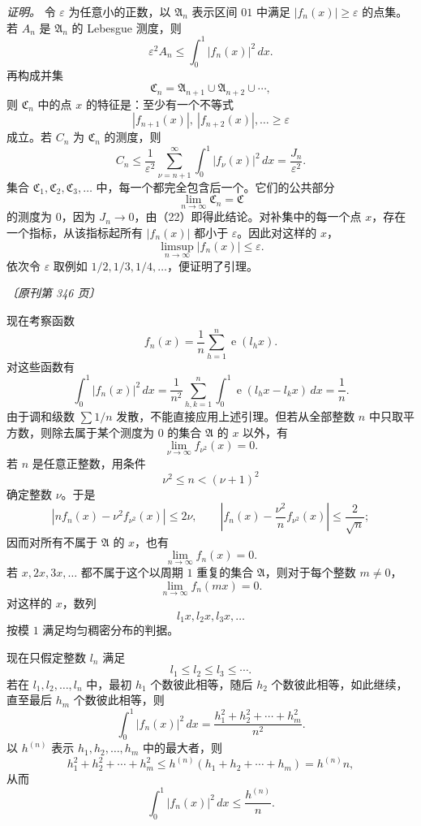 \documentclass[UTF8,11pt,a4paper,fontset=none]{ctexart}
\theoremstyle{weylthm}
\newcommand{\e}{\operatorname{e}}
\newcommand{\origpage}[1]{%
  \par\vspace{0.7em}\noindent\hfill{\small\itshape〔原刊第 #1 页〕}\par\vspace{0.25em}}
\begin{document}
\textit{证明。}
令 \(\varepsilon\) 为任意小的正数，以 \(\mathfrak A_n\) 表示区间 \(01\) 中满足
\(|f_n(x)|\geq\varepsilon\) 的点集。若 \(A_n\) 是 \(\mathfrak A_n\) 的 Lebesgue 测度，则
\[
  \varepsilon^2A_n\leq\int_0^1|f_n(x)|^2\,dx.
\]
再构成并集
\[
  \mathfrak C_n=\mathfrak A_{n+1}\cup\mathfrak A_{n+2}\cup\cdots,
\]
则 \(\mathfrak C_n\) 中的点 \(x\) 的特征是：至少有一个不等式
\[
  |f_{n+1}(x)|,\ |f_{n+2}(x)|,\ldots\geq\varepsilon
\]
成立。若 \(C_n\) 为 \(\mathfrak C_n\) 的测度，则
\begin{equation}
  C_n\leq\frac1{\varepsilon^2}
  \sum_{\nu=n+1}^{\infty}\int_0^1|f_\nu(x)|^2\,dx
  =\frac{J_n}{\varepsilon^2}.
  \tag{22}
\end{equation}
集合 \(\mathfrak C_1,\mathfrak C_2,\mathfrak C_3,\ldots\) 中，每一个都完全包含后一个。它们的公共部分
\[
  \lim_{n\to\infty}\mathfrak C_n=\mathfrak C
\]
的测度为 \(0\)，因为 \(J_n\to0\)，由（22）即得此结论。对补集中的每一个点 \(x\)，存在一个指标，从该指标起所有
\(|f_n(x)|\) 都小于 \(\varepsilon\)。因此对这样的 \(x\)，
\[
  \limsup_{n\to\infty}|f_n(x)|\leq\varepsilon.
\]
依次令 \(\varepsilon\) 取例如 \(1/2,1/3,1/4,\ldots\)，便证明了引理。

\origpage{346}

现在考察函数
\[
  f_n(x)=\frac1n\sum_{h=1}^{n}\e(l_hx).
\]
对这些函数有
\[
  \int_0^1|f_n(x)|^2\,dx
  =\frac1{n^2}\sum_{h,k=1}^{n}\int_0^1\e(l_hx-l_kx)\,dx
  =\frac1n.
\]
由于调和级数 \(\sum 1/n\) 发散，不能直接应用上述引理。但若从全部整数 \(n\) 中只取平方数，则除去属于某个测度为 \(0\) 的集合 \(\mathfrak A\) 的 \(x\) 以外，有
\[
  \lim_{\nu\to\infty}f_{\nu^2}(x)=0.
\]
若 \(n\) 是任意正整数，用条件
\[
  \nu^2\leq n<(\nu+1)^2
\]
确定整数 \(\nu\)。于是
\[
  |nf_n(x)-\nu^2f_{\nu^2}(x)|\leq2\nu,
  \qquad
  \left|f_n(x)-\frac{\nu^2}{n}f_{\nu^2}(x)\right|
  \leq\frac2{\sqrt n};
\]
因而对所有不属于 \(\mathfrak A\) 的 \(x\)，也有
\[
  \lim_{n\to\infty}f_n(x)=0.
\]
若 \(x,2x,3x,\ldots\) 都不属于这个以周期 \(1\) 重复的集合 \(\mathfrak A\)，则对于每个整数 \(m\neq0\)，
\[
  \lim_{n\to\infty}f_n(mx)=0.
\]
对这样的 \(x\)，数列
\[
  l_1x,l_2x,l_3x,\ldots
\]
按模 \(1\) 满足均匀稠密分布的判据。

现在只假定整数 \(l_n\) 满足
\[
  l_1\leq l_2\leq l_3\leq\cdots.
\]
若在 \(l_1,l_2,\ldots,l_n\) 中，最初 \(h_1\) 个数彼此相等，随后 \(h_2\) 个数彼此相等，如此继续，直至最后 \(h_m\) 个数彼此相等，则
\[
  \int_0^1|f_n(x)|^2\,dx
  =\frac{h_1^2+h_2^2+\cdots+h_m^2}{n^2}.
\]
以 \(h^{(n)}\) 表示 \(h_1,h_2,\ldots,h_m\) 中的最大者，则
\[
  h_1^2+h_2^2+\cdots+h_m^2
  \leq h^{(n)}(h_1+h_2+\cdots+h_m)
  =h^{(n)}n,
\]
从而
\[
  \int_0^1|f_n(x)|^2\,dx\leq\frac{h^{(n)}}n.
\]
\end{document}
